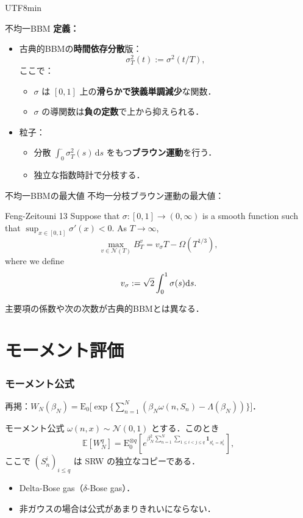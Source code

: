 \documentclass{beamer}
\newcommand{\DE}{{\mathrm E}}
\newcommand{\IE}{\mathbb E}
\begin{document}
\begin{CJK*}{UTF8}{min}
\begin{frame}{不均一BBM}
\textbf{定義：}
\begin{itemize}
    \item 古典的BBMの\textbf{時間依存分散}版：
    \[
    \sigma_T^2(t) := \sigma^2(t/T),
    \]
    ここで：
    \begin{itemize}
        \item \( \sigma \) は \( [0, 1] \) 上の\textbf{滑らかで狭義単調減少}な関数．
        \item \( \sigma \) の導関数は\textbf{負の定数}で上から抑えられる．
    \end{itemize}
    \item 粒子：
    \begin{itemize}
        \item 分散 \( \int_0^{\cdot} \sigma_T^2(s)\, \mathrm{d}s\) をもつ\textbf{ブラウン運動}を行う．
        \item 独立な指数時計で分枝する．
    \end{itemize}
\end{itemize}

\end{frame}
\begin{frame}{不均一BBMの最大値}
不均一分枝ブラウン運動の最大値：
\begin{block}{Feng-Zeitouni 13}
Suppose that $\sigma:[0,1]\to (0,\infty)$ is a smooth function such that $\sup_{x\in [0,1]}\sigma'(x)<0$. As $T\to\infty$, 
  \[\max_{v \in \mathcal N(T)} B^v_T = v_\sigma T - \Omega(T^{1/3}),\]
  where we define
  $$v_\sigma := \sqrt 2 \int_0^1 \sigma(s) {\rm d} s.$$
\end{block}
\pause[2]
主要項の係数や次の次数が古典的BBMとは異なる．
\end{frame}






\section{モーメント評価}
\begin{frame}
\frametitle{モーメント公式}
再掲：$W_N(\beta_N)=\DE_0\big[\exp\big\{\sum_{n=1}^N (\beta_N \omega(n,S_n) - \Lambda(\beta_N))\big\}\big]$．
\begin{block}{モーメント公式}
  $\omega(n,x)\sim \mathcal N(0,1)$ とする．このとき
\[
\IE\left[W_N^q\right] = \DE^{\otimes q}_0\left[e^{\beta_N^2\sum_{n=1}^N \sum_{1\leq i<j \leq q} \mathbf{1}_{S_n^{i} = S_n^j}} \right],
\]
ここで $(S^i_n)_{i\leq q}$ は SRW の独立なコピーである．
\end{block}
\begin{itemize}
  \item Delta-Bose gas（$\delta$-Bose gas）．
  \item 非ガウスの場合は公式があまりきれいにならない．
\end{itemize}
\end{frame}


\end{CJK*}
\end{document}
